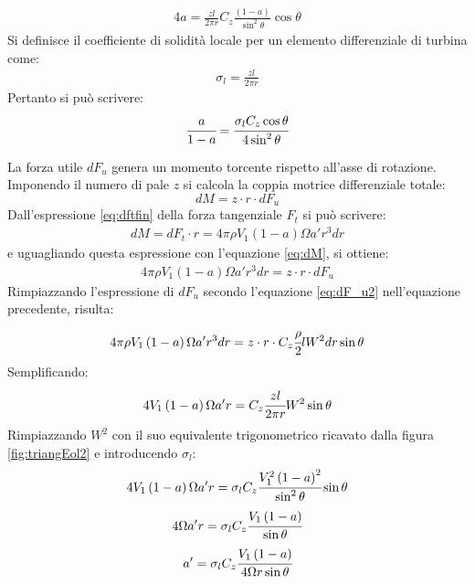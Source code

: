 \begin{align*}
4 a = \frac{z l }{2 \pi r} C_z \frac{\left( 1- a \right)}{\sin^2 \theta} \cos \theta
\end{align*}
Si definisce il coefficiente di solidità locale per un elemento differenziale di turbina come:
\begin{align*}
\sigma_l = \frac{z l}{2 \pi r}
\end{align*}
Pertanto si può scrivere:
\begin{equation}\label{eq:asolid}
\cfrac{a}{1-a} = \cfrac{\sigma_l C_z \cos \theta}{4 \sin^2 \theta}
\end{equation}

La forza utile $dF_u$ genera un momento torcente rispetto all'asse di rotazione. Imponendo il numero di pale $z$ si calcola la coppia motrice differenziale totale:
\begin{equation}\label{eq:dM}
dM = z \cdot r \cdot dF_u
\end{equation}
Dall'espressione \ref{eq:dftfin} della forza tangenziale $F_t$ si può scrivere:
\begin{align*}
dM = dF_t \cdot r = 4 \pi \rho V_1 \left( 1- a \right) \Omega a' r^3 dr
\end{align*}
e uguagliando questa espressione con l'equazione \ref{eq:dM}, si ottiene:
\begin{align*}
4 \pi \rho V_1 \left(1-a \right) \Omega a' r^3 dr = z \cdot r \cdot dF_u
\end{align*}
Rimpiazzando l'espressione di $dF_u$ secondo l'equazione \ref{eq:dF_u2} nell'equazione precedente, risulta:
\begin{align*}
4 \pi \rho V_1 \left(1-a \right) \Omega a' r^3 dr = z \cdot r \cdot C_z \cfrac{\rho}{2} l W^2 dr \sin \theta
\end{align*}
Semplificando:
\begin{align*}
4 V_1 \left(1-a \right) \Omega a' r = C_z \cfrac{z l }{2 \pi r} W^2 \sin \theta
\end{align*}
Rimpiazzando $W^2$ con il suo equivalente trigonometrico ricavato dalla figura \ref{fig:triangEol2} e introducendo $\sigma_l$:
\begin{align*}
4 V_1 \left(1-a \right) \Omega a' r = \sigma_l C_z \cfrac{V_1^2 \left(1-a \right)^2}{\sin^2 \theta} \sin \theta
\end{align*}
\begin{align*}
4 \Omega a' r = \sigma_l C_z \cfrac{V_1 \left(1-a \right)}{\sin \theta}
\end{align*}
\begin{align*}
a'= \sigma_l C_z \cfrac{V_1 \left(1-a \right)}{4 \Omega r \sin \theta}
\end{align*}

